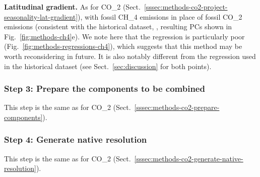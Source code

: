\textbf{Latitudinal gradient.}
As for CO_2 (Sect.~\ref{sssec:methods-co2-project-seasonality-lat-gradient}),
with fossil CH_4 emissions in place of fossil CO_2 emissions
(consistent with the historical dataset, \citealp{nicholls_historical-ghgs_2026}, resulting PCs shown in Fig.~\ref{fig:methods-ch4}e).
We note here that the regression is particularly poor (Fig.~\ref{fig:methods-regressions-ch4}),
which suggests that this method may be worth reconsidering in future.
It is also notably different from the regression used in the historical dataset
(see Sect.~\ref{sec:discussion} for both points).

\subsubsection{Step 3: Prepare the components to be combined}
\label{sssec:methods-ch4-prepare-components}

This step is the same as for CO_2 (Sect.~\ref{sssec:methods-co2-prepare-components}).

\subsubsection{Step 4: Generate native resolution}
\label{sssec:methods-ch4-generate-native-resolution}

This step is the same as for CO_2 (Sect.~\ref{sssec:methods-co2-generate-native-resolution}).

